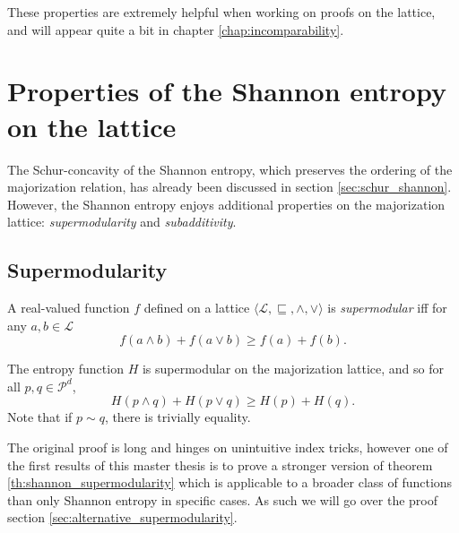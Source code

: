 
These properties are extremely helpful when working on proofs on the lattice, and will appear quite a bit in chapter \ref{chap:incomparability}.



\section{Properties of the Shannon entropy on the lattice}

The Schur-concavity of the Shannon entropy, which preserves the ordering of the majorization relation, has already been discussed in section \ref{sec:schur_shannon}. However, the Shannon entropy enjoys additional properties on the majorization lattice: \textit{supermodularity} and \textit{subadditivity}.



\subsection{Supermodularity} \label{sec:supermodularity}

\begin{definition}
    A real-valued function $f$ defined on a lattice $\langle \mathcal{L}, \sqsubseteq, \wedge, \vee \rangle$ is \textit{supermodular} iff for any $a, b \in \mathcal{L}$
    \begin{equation}
        f(a \wedge b) + f(a \vee b) \geq f(a) + f(b).
    \end{equation}
\end{definition}


\begin{theorem} \label{th:shannon_supermodularity}
    The entropy function $H$ is supermodular on the majorization lattice, and so for all $p, q \in \mathcal{P}^d$,
    \begin{equation} \label{eq:supermodularity_shannon}
        H(p \wedge q) + H(p \vee q) \geq H(p) + H(q).
    \end{equation}
    Note that if $p \sim q$, there is trivially equality.
\end{theorem}

The original proof is long and hinges on unintuitive index tricks, however one of the first results of this master thesis is to prove a stronger version of theorem \ref{th:shannon_supermodularity} which is applicable to a broader class of functions than only Shannon entropy in specific cases. As such we will go over the proof section \ref{sec:alternative_supermodularity}.

